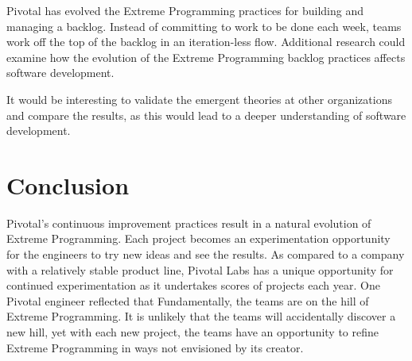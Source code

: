 Pivotal has evolved the Extreme Programming practices for building and managing a backlog. Instead of committing to work to be done each week, teams work off the top of the backlog in an iteration-less flow. Additional research could examine how the evolution of the Extreme Programming backlog practices affects software development.


It would be interesting to validate the emergent theories at other organizations and compare the results, as this would lead to a deeper understanding of software development. 
\section{Conclusion}
Pivotal's continuous improvement practices result in a natural evolution of Extreme Programming.  Each project becomes an experimentation opportunity for the engineers to try new ideas and see the results. As compared to a company with a relatively stable product line, Pivotal Labs has a unique opportunity for continued experimentation as it undertakes scores of projects each year. One Pivotal engineer reflected that  Fundamentally, the teams are on the hill of Extreme Programming. It is unlikely that the teams will accidentally discover a new hill, yet with each new project, the teams have an opportunity to refine Extreme Programming in ways not envisioned by its creator. 


